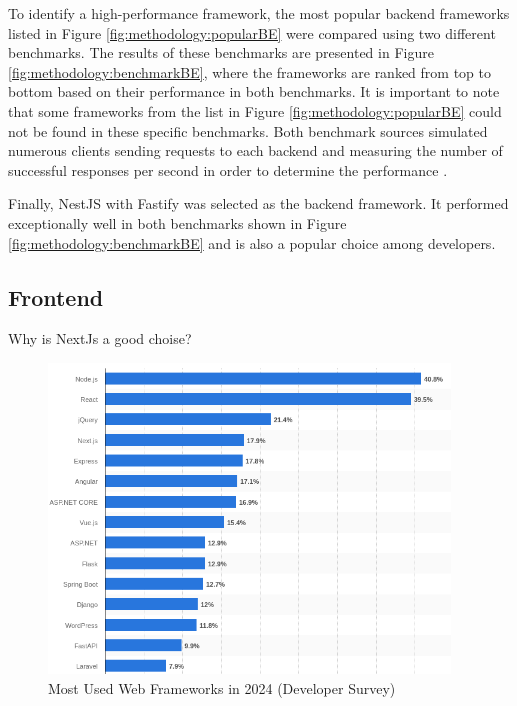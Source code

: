 To identify a high-performance framework, the most popular backend frameworks listed in Figure \ref{fig:methodology:popularBE} were compared using two different benchmarks. The results of these benchmarks are presented in Figure \ref{fig:methodology:benchmarkBE}, where the frameworks are ranked from top to bottom based on their performance in both benchmarks. It is important to note that some frameworks from the list in Figure \ref{fig:methodology:popularBE} could not be found in these specific benchmarks. Both benchmark sources simulated numerous clients sending requests to each backend and measuring the number of successful responses per second in order to determine the performance \cite{backend:benchmark1, backend:benchmark2}.

Finally, NestJS \cite{methodology:nestjs} with Fastify was selected as the backend framework. It performed exceptionally well in both benchmarks shown in Figure \ref{fig:methodology:benchmarkBE} and is also a popular choice among developers.

\subsection{Frontend}
\label{subsec:methodology:frameworks:frontend}
Why is NextJs a good choise?

\begin{figure}[htbp]
  \centering
  \includegraphics[width=0.95\textwidth]{gfx/figures/Top15_Frameworks_2024_Statista.png}
  \caption{Most Used Web Frameworks in 2024 (Developer Survey) \cite{frontend:popularity}}
  \label{fig:methodology:popularFE}
\end{figure}

